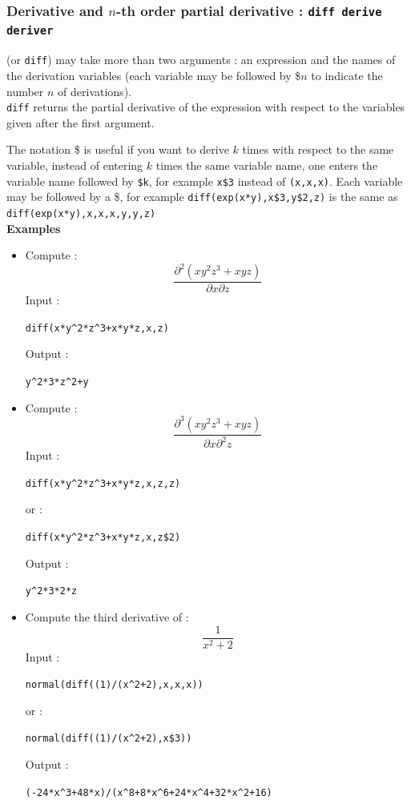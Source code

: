 \documentclass[a4paper,11pt]{book}
\begin{document}
\subsubsection{Derivative and $n$-th order
partial derivative : {\tt diff derive deriver}}\index{\$}
 (or {\tt diff}) may take more than two arguments : an
expression and the names of the derivation variables (each variable
may be followed by \$$n$ to indicate the number $n$ of derivations).\\
{\tt diff} returns the partial derivative of the expression with respect to 
the variables given after the first argument.

The notation \$ is useful if you want to derive $k$ times with
respect to the same variable, instead of entering $k$ times the
same variable name, one enters the variable name followed by {\tt \$k},
for example {\tt x\$3} instead of {\tt(x,x,x)}. 
Each variable may be followed by a \$, for example 
{\tt diff(exp(x*y),x\$3,y\$2,z)} is the same as 
{\tt diff(exp(x*y),x,x,x,y,y,z)}\\
{\bf Examples}
\begin{itemize}
\item Compute :
$$\frac {\partial^2 (x y^2 z^3+x y z)}{\partial x\partial z}$$
Input :
\begin{center}{\tt diff(x*y\verb|^|2*z\verb|^|3+x*y*z,x,z)}\end{center}
Output  :
\begin{center}{\tt y\verb|^|2*3*z\verb|^|2+y}\end{center}
\item Compute :
$$\frac {\partial^3 (x y^2 z^3+x y z)}{\partial x\partial^2 z}$$
Input :
\begin{center}{\tt  diff(x*y\verb|^|2*z\verb|^|3+x*y*z,x,z,z)}\end{center}
or :
\begin{center}{\tt  diff(x*y\verb|^|2*z\verb|^|3+x*y*z,x,z\$2)}\end{center}
Output  :
\begin{center}{\tt y\verb|^|2*3*2*z}\end{center}
\item Compute the third derivative of :
$$\frac{1}{x^2+2}$$
Input :
\begin{center}{\tt  normal(diff((1)/(x\verb|^|2+2),x,x,x))}\end{center}
or :
\begin{center}{\tt  normal(diff((1)/(x\verb|^|2+2),x\$3))}\end{center}
Output  :
\begin{center}{\tt (-24*x\verb|^|3+48*x)/(x\verb|^|8+8*x\verb|^|6+24*x\verb|^|4+32*x\verb|^|2+16)}\end{center}
\end{itemize}
\end{document}
